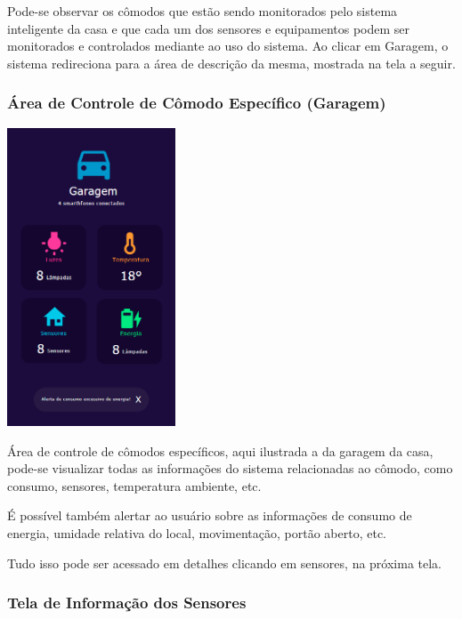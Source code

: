 \par Pode-se observar os cômodos que estão sendo monitorados pelo sistema inteligente da casa e que cada um dos sensores e equipamentos podem ser monitorados e controlados mediante ao uso do sistema. Ao clicar em Garagem, o sistema redireciona para a área de descrição da mesma, mostrada na tela a seguir.

\subsubsection{Área de Controle de Cômodo Específico (Garagem)}

\begin{center}
\includegraphics[width=5cm]{figuras/3}
\end{center}

\par Área de controle de cômodos específicos, aqui ilustrada a da garagem da casa, pode-se visualizar todas as informações do sistema relacionadas ao cômodo, como consumo, sensores, temperatura ambiente, etc.
\par É possível também alertar ao usuário sobre as informações de consumo de energia, umidade relativa do local, movimentação, portão aberto, etc.
\par Tudo isso pode ser acessado em detalhes clicando em sensores, na próxima tela.

\subsubsection{Tela de Informação dos Sensores}

